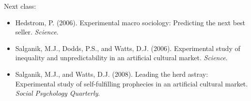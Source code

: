 \documentclass[aspectratio=169]{beamer}
\begin{document}
\begin{frame}

Next class:
\begin{itemize}
\item Hedstrom, P. (2006). Experimental macro sociology: Predicting the next best seller. \textit{Science}.
\item Salganik, M.J., Dodds, P.S., and Watts, D.J. (2006). Experimental study of inequality and unpredictability in an artificial cultural market. \textit{Science}.
\item Salganik, M.J., and Watts, D.J. (2008). Leading the herd astray: Experimental study of self-fulfilling prophecies in an artificial cultural market. \textit{Social Psychology Quarterly}.
\end{itemize}


\end{frame}
\end{document}
